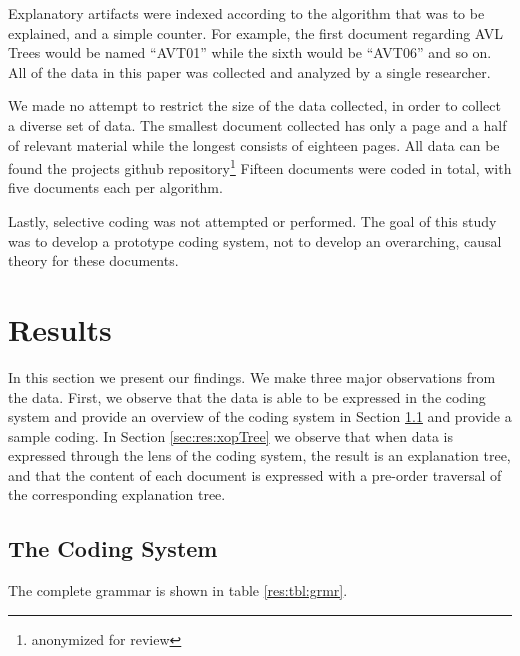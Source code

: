 \documentclass[sigconf]{acmart}
\begin{document}
Explanatory artifacts were indexed according to the algorithm that was to be
explained, and a simple counter. For example, the first document regarding AVL
Trees would be named ``AVT01'' while the sixth would be ``AVT06'' and so on.
All of the data in this paper was collected and analyzed by a single researcher.

We made no attempt to restrict the size of the data collected, in order to
collect a diverse set of data. The smallest document collected has only a page
and a half of relevant material while the longest consists of eighteen pages.
All data can be found the projects github repository\footnote[1]{anonymized for
  review} Fifteen documents were coded in total, with five documents each per
algorithm.

Lastly, selective coding was not attempted or performed. The goal of this study
was to develop a prototype coding system, not to develop an overarching, causal
theory for these documents.

\section{Results}
In this section we present our findings. We make three major observations from
the data. First, we observe that the data is able to be expressed in the coding
system and provide an overview of the coding system in Section \ref{sec:res:sys}
and provide a sample coding. In Section \ref{sec:res:xopTree} we observe that
when data is expressed through the lens of the coding system, the result is an
explanation tree, and that the content of each document is expressed with a
pre-order traversal of the corresponding explanation tree.

\subsection{The Coding System}
\label{sec:res:sys}

The complete grammar is shown in table \ref{res:tbl:grmr}.




\end{document}
